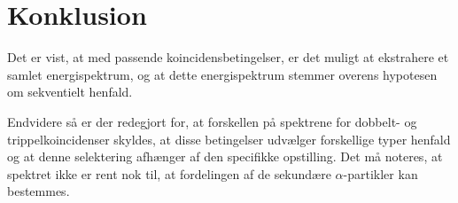 \section{Konklusion}
\label{sec:sekv-konklusion}

Det er vist, at med passende koincidensbetingelser, er det muligt at ekstrahere et samlet
energispektrum, og at dette energispektrum stemmer overens hypotesen om sekventielt
henfald.

Endvidere så er der redegjort for, at forskellen på spektrene for dobbelt- og
trippelkoincidenser skyldes, at disse betingelser udvælger forskellige typer henfald og at denne
selektering afhænger af den specifikke opstilling.  Det må noteres, at spektret ikke er rent nok
til, at fordelingen af de sekundære $\alpha$-partikler kan bestemmes.






